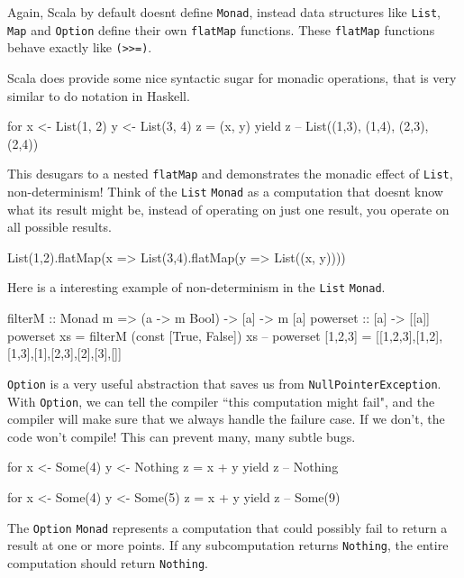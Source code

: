 \documentclass[12pt]{article}
\begin{document}
Again, Scala by default doesnt define \texttt{Monad}, instead data structures
like \texttt{List}, \texttt{Map} and \texttt{Option} define their own
\texttt{flatMap} functions. These \texttt{flatMap} functions behave exactly like
\texttt{(>>=)}.

Scala does provide some nice syntactic sugar for monadic operations, that is
very similar to do notation in Haskell.
\begin{scala}
for {
    x <- List(1, 2)
    y <- List(3, 4)
    z = (x, y)
} yield z
-- List((1,3), (1,4), (2,3), (2,4))
\end{scala}
This desugars to a nested \texttt{flatMap} and demonstrates the monadic effect
of \texttt{List}, non-determinism! Think of the \texttt{List} \texttt{Monad} as a
computation that doesnt know what its result might be, instead of operating on
just one result, you operate on all possible results.
\begin{scala}
List(1,2).flatMap(x => List(3,4).flatMap(y => List((x, y))))
\end{scala}

Here is a interesting example of non-determinism in the \texttt{List} \texttt{Monad}.
\begin{haskell}
filterM :: Monad m => (a -> m Bool) -> [a] -> m [a]
powerset :: [a] -> [[a]]
powerset xs = filterM (const [True, False]) xs
-- powerset [1,2,3] = [[1,2,3],[1,2],[1,3],[1],[2,3],[2],[3],[]]
\end{haskell}
\newpage

\texttt{Option} is a very useful abstraction that saves us from
\texttt{NullPointerException}.  With \texttt{Option}, we can tell the compiler
``this computation might fail", and the compiler will make sure that we always
handle the failure case. If we don't, the code won't compile! This can prevent
many, many subtle bugs.
\begin{scala}
for {
    x <- Some(4)
    y <- Nothing
    z = x + y
} yield z
-- Nothing

for {
    x <- Some(4)
    y <- Some(5)
    z = x + y
} yield z
-- Some(9)
\end{scala}

The \texttt{Option} \texttt{Monad} represents a computation that could possibly
fail to return a result at one or more points. If any subcomputation returns
\texttt{Nothing}, the entire computation should return \texttt{Nothing}.
\end{document}
